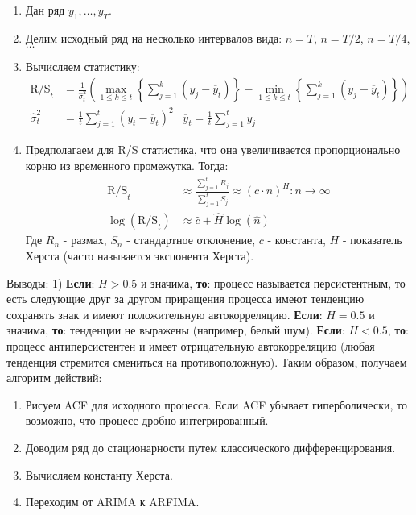 \begin{enumerate}
	\item Дан ряд $y_1, \ldots, y_{T}$.
	\item Делим исходный ряд на несколько интервалов вида: $n = T$, $n = T / 2$, $n = T / 4$, $\ldots$
	\item Вычисляем статистику:
	\begin{equation}
		\begin{split}
			\text{R/S}_t & = \frac{1}{\hat{\sigma}^2_t} \left(\max_{1 \le k \le t} \left\{\sum_{j = 1}^k (y_j - \overline{y}_t)\right\} - \min_{1 \le k \le t} \left\{\sum_{j = 1}^k (y_j - \overline{y}_t)\right\}\right)\\
			\hat{\sigma}^2_t & = \frac{1}{t} \sum_{j = 1}^t (y_t - \overline{y}_t)^2 \;\;\; \overline{y}_t = \frac{1}{t} \sum_{j = 1}^t y_j
		\end{split}		
	\end{equation}
	\item Предполагаем для R/S статистика, что она увеличивается пропорционально корню из временного промежутка. Тогда:
	\begin{equation}
		\begin{split}
			\text{R/S}_t & \approx \frac{\sum_{j = 1}^t R_j}{\sum_{j = 1}^t S_j} \approx (c \cdot n)^H: n \to \infty\\
			\log\left(\text{R/S}_t\right) & \approx \hat{c} + \hat{H} \log(\hat{n})
		\end{split}
	\end{equation}
	Где $R_n$ - размах, $S_n$ - стандартное отклонение, $c$ - константа, $H$ - показатель Херста (часто называется экспонента Херста).
\end{enumerate}
Выводы: 1) \textbf{Если}: $H > 0.5$ и значима, \textbf{то}: процесс называется персистентным, то есть следующие друг за другом приращения процесса имеют тенденцию сохранять знак и имеют положительную автокорреляцию. \textbf{Если}: $H = 0.5$ и значима, \textbf{то}: тенденции не выражены (например, белый шум). \textbf{Если}: $H < 0.5$, \textbf{то}: процесс антиперсистентен и имеет отрицательную автокорреляцию (любая тенденция стремится смениться на противоположную). Таким образом, получаем алгоритм действий:
\begin{enumerate}
	\item Рисуем ACF для исходного процесса. Если ACF убывает гиперболически, то возможно, что процесс дробно-интегрированный.
	\item Доводим ряд до стационарности путем классического дифференцирования.
	\item Вычисляем константу Херста.
	\item Переходим от ARIMA к ARFIMA.
\end{enumerate}
